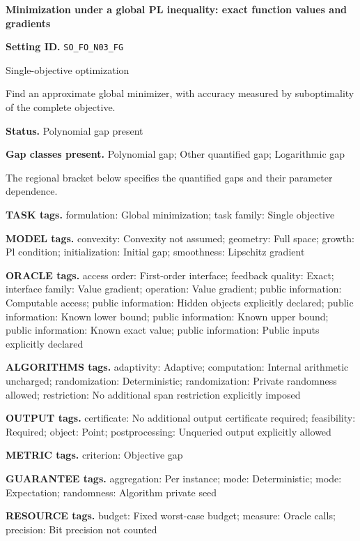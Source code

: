 \documentclass[10pt,a4paper]{article}
\begin{document}
\raggedright

{\LARGE\bfseries\sffamily\color{AtlasNavy} Minimization under a global PL inequality: exact function values and gradients\par}\vspace{5pt}
\textbf{Setting ID.} \texttt{SO\_\allowbreak{}FO\_\allowbreak{}N03\_\allowbreak{}FG}

Single-objective optimization

Find an approximate global minimizer, with accuracy measured by suboptimality of the complete objective.

\textbf{Status.} Polynomial gap present

\textbf{Gap classes present.} Polynomial gap; Other quantified gap; Logarithmic gap

The regional bracket below specifies the quantified gaps and their parameter dependence.

\textbf{TASK tags.} formulation: Global minimization; task family: Single objective

\textbf{MODEL tags.} convexity: Convexity not assumed; geometry: Full space; growth: Pl condition; initialization: Initial gap; smoothness: Lipschitz gradient

\textbf{ORACLE tags.} access order: First-order interface; feedback quality: Exact; interface family: Value gradient; operation: Value gradient; public information: Computable access; public information: Hidden objects explicitly declared; public information: Known lower bound; public information: Known upper bound; public information: Known exact value; public information: Public inputs explicitly declared

\textbf{ALGORITHMS tags.} adaptivity: Adaptive; computation: Internal arithmetic uncharged; randomization: Deterministic; randomization: Private randomness allowed; restriction: No additional span restriction explicitly imposed

\textbf{OUTPUT tags.} certificate: No additional output certificate required; feasibility: Required; object: Point; postprocessing: Unqueried output explicitly allowed

\textbf{METRIC tags.} criterion: Objective gap

\textbf{GUARANTEE tags.} aggregation: Per instance; mode: Deterministic; mode: Expectation; randomness: Algorithm private seed

\textbf{RESOURCE tags.} budget: Fixed worst-case budget; measure: Oracle calls; precision: Bit precision not counted
\end{document}
